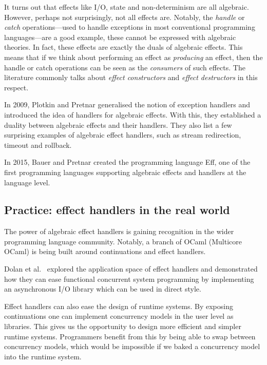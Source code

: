 \documentclass[class=article,crop=false,11pt]{standalone}
\begin{document}
It turns out that effects like I/O, state and non-determinism are all algebraic.
However, perhaps not surprisingly, not all effects are. Notably, the
\emph{handle} or \emph{catch} operations---used to handle exceptions in
most conventional programming languages---are a good example, these cannot be
expressed with algebraic theories.
%
In fact, these effects are exactly the duals of algebraic effects. This means
that if we think about performing an effect as \emph{producing} an effect, then
the handle or catch operations can be seen as the \emph{consumers} of such
effects. The literature commonly talks about \emph{effect constructors} and
\emph{effect destructors} in this respect.

In 2009, Plotkin and Pretnar \cite{plotkin2009handlers} generalised the notion
of exception handlers and introduced the idea of handlers for algebraic effects.
With this, they established a duality between algebraic effects and their
handlers. They also list a few surprising examples of algebraic effect handlers,
such as stream redirection, timeout and rollback.

In 2015, Bauer and Pretnar \cite{bauer2015programming} created the programming
language Eff, one of the first programming languages supporting algebraic
effects and handlers at the language level.

\subsection{Practice: effect handlers in the real world}

The power of algebraic effect handlers is gaining recognition in the wider
programming language community. Notably, a branch of OCaml (Multicore OCaml)
is being built around continuations and effect handlers.

Dolan et al.\ \cite{dolan2017concurrent} explored the application space of
effect handlers and demonstrated how they can ease functional concurrent
system programming by implementing an asynchronous I/O library which can be
used in direct style.

Effect handlers can also ease the design of runtime systems. By exposing
continuations one can implement concurrency models in the user level as
libraries. This gives us the opportunity to design more efficient and simpler
runtime systems. Programmers benefit from this by being able to swap between
concurrency models, which would be impossible if we baked a concurrency model
into the runtime system.

\ifstandalone
{}

\fi
\end{document}

